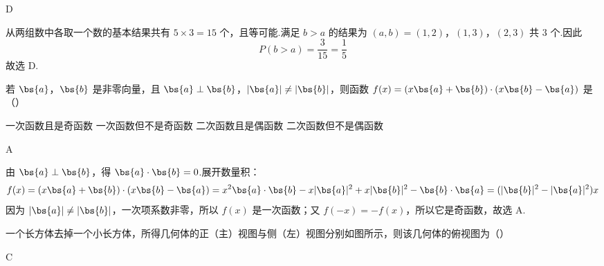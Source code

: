 \begin{answer}
D
\end{answer}

\begin{solution}
从两组数中各取一个数的基本结果共有 \(5\times3=15\) 个，且等可能.满足 \(b>a\) 的结果为
\((a,b)=(1,2)\)，\((1,3)\)，\((2,3)\)
共 \(3\) 个.因此
\[
P(b>a)=\frac{3}{15}=\frac{1}{5}
\]
故选 D.
\end{solution}

\begin{problem}
若 \(\bs{a}\)，\(\bs{b}\) 是非零向量，且 \(\bs{a} \perp \bs{b}\)，\(|\bs{a}| \neq |\bs{b}|\)，则函数 \(f(x) = (x\bs{a} + \bs{b}) \cdot (x\bs{b} - \bs{a})\) 是（\quad）

\choices
    {一次函数且是奇函数}
    {一次函数但不是奇函数}
    {二次函数且是偶函数}
    {二次函数但不是偶函数}
\end{problem}

\begin{answer}
A
\end{answer}

\begin{solution}
由 \(\bs{a}\perp\bs{b}\)，得 \(\bs{a}\cdot\bs{b}=0\).展开数量积：
\[
f(x)=(x\bs{a}+\bs{b})\cdot(x\bs{b}-\bs{a})
=x^2\bs{a}\cdot\bs{b}-x|\bs{a}|^2+x|\bs{b}|^2-\bs{b}\cdot\bs{a}
=(|\bs{b}|^2-|\bs{a}|^2)x
\]
因为 \(|\bs{a}|\ne|\bs{b}|\)，一次项系数非零，所以 \(f(x)\) 是一次函数；又 \(f(-x)=-f(x)\)，所以它是奇函数，故选 A.
\end{solution}

\begin{problem}
一个长方体去掉一个小长方体，所得几何体的正（主）视图与侧（左）视图分别如图所示，则该几何体的俯视图为（\quad）


    {}
    {}
    {}
\end{problem}

\begin{answer}
C
\end{answer}


